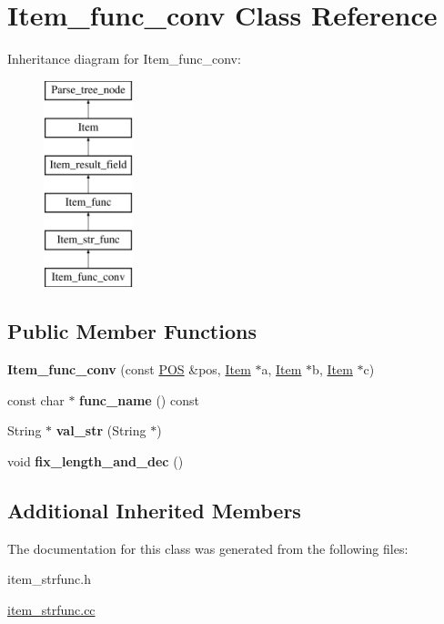 \hypertarget{classItem__func__conv}{}\section{Item\+\_\+func\+\_\+conv Class Reference}
\label{classItem__func__conv}
Inheritance diagram for Item\+\_\+func\+\_\+conv\+:\begin{figure}[H]
\begin{center}
\leavevmode
\includegraphics[height=6.000000cm]{classItem__func__conv}
\end{center}
\end{figure}
\subsection*{Public Member Functions}
\begin{DoxyCompactItemize}
\item 
\mbox{\label{classItem__func__conv_aa8b3122a3d096aa02f7faab433ef0bfb}} 
{\bfseries Item\+\_\+func\+\_\+conv} (const \mbox{\hyperlink{structYYLTYPE}{P\+OS}} \&pos, \mbox{\hyperlink{classItem}{Item}} $\ast$a, \mbox{\hyperlink{classItem}{Item}} $\ast$b, \mbox{\hyperlink{classItem}{Item}} $\ast$c)
\item 
\mbox{\label{classItem__func__conv_ad624f698fc10e17b5a5e6fd0d3b3a53d}} 
const char $\ast$ {\bfseries func\+\_\+name} () const
\item 
\mbox{\label{classItem__func__conv_a01da87c43a48b36b09e2499b8d636f1d}} 
String $\ast$ {\bfseries val\+\_\+str} (String $\ast$)
\item 
\mbox{\label{classItem__func__conv_a80be51bf66cd19bbc30764f67969ffaf}} 
void {\bfseries fix\+\_\+length\+\_\+and\+\_\+dec} ()
\end{DoxyCompactItemize}
\subsection*{Additional Inherited Members}


The documentation for this class was generated from the following files\+:\begin{DoxyCompactItemize}
\item 
item\+\_\+strfunc.\+h\item 
\mbox{\hyperlink{item__strfunc_8cc}{item\+\_\+strfunc.\+cc}}\end{DoxyCompactItemize}
